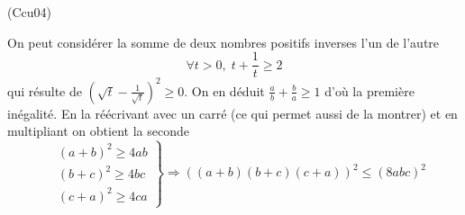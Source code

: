 \begin{tiny}(Ccu04)\end{tiny} On peut considérer la somme de deux nombres positifs inverses l'un de l'autre
\begin{displaymath}
  \forall t >0,\; t + \frac{1}{t} \geq 2
\end{displaymath}
qui résulte de $(\sqrt{t} - \frac{1}{\sqrt{t}})^2\geq 0$.\newline
On en déduit $\frac{a}{b} + \frac{b}{a}\geq 1$ d'où la première inégalité. En la réécrivant avec un carré (ce qui permet aussi de la montrer) et en multipliant on obtient la seconde
\begin{displaymath}
\left. 
\begin{aligned}
  &(a+b)^2 \geq 4ab \\ &(b+c)^2 \geq 4bc \\&(c+a)^2 \geq 4ca 
\end{aligned}
\right\rbrace   \Rightarrow \left( (a+b)(b+c)(c+a)\right)^2 \leq \left( 8abc\right) ^2
\end{displaymath}
